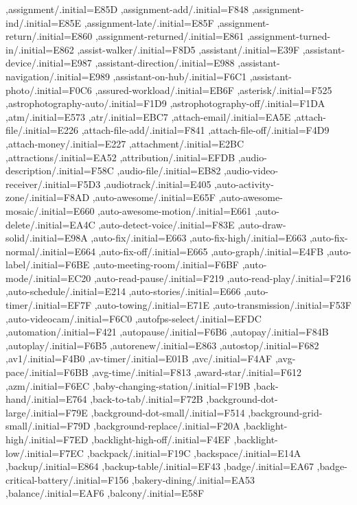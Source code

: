 { ,assignment/.initial=E85D
 ,assignment-add/.initial=F848
 ,assignment-ind/.initial=E85E
 ,assignment-late/.initial=E85F
 ,assignment-return/.initial=E860
 ,assignment-returned/.initial=E861
 ,assignment-turned-in/.initial=E862
 ,assist-walker/.initial=F8D5
 ,assistant/.initial=E39F
 ,assistant-device/.initial=E987
 ,assistant-direction/.initial=E988
 ,assistant-navigation/.initial=E989
 ,assistant-on-hub/.initial=F6C1
 ,assistant-photo/.initial=F0C6
 ,assured-workload/.initial=EB6F
 ,asterisk/.initial=F525
 ,astrophotography-auto/.initial=F1D9
 ,astrophotography-off/.initial=F1DA
 ,atm/.initial=E573
 ,atr/.initial=EBC7
 ,attach-email/.initial=EA5E
 ,attach-file/.initial=E226
 ,attach-file-add/.initial=F841
 ,attach-file-off/.initial=F4D9
 ,attach-money/.initial=E227
 ,attachment/.initial=E2BC
 ,attractions/.initial=EA52
 ,attribution/.initial=EFDB
 ,audio-description/.initial=F58C
 ,audio-file/.initial=EB82
 ,audio-video-receiver/.initial=F5D3
 ,audiotrack/.initial=E405
 ,auto-activity-zone/.initial=F8AD
 ,auto-awesome/.initial=E65F
 ,auto-awesome-mosaic/.initial=E660
 ,auto-awesome-motion/.initial=E661
 ,auto-delete/.initial=EA4C
 ,auto-detect-voice/.initial=F83E
 ,auto-draw-solid/.initial=E98A
 ,auto-fix/.initial=E663
 ,auto-fix-high/.initial=E663
 ,auto-fix-normal/.initial=E664
 ,auto-fix-off/.initial=E665
 ,auto-graph/.initial=E4FB
 ,auto-label/.initial=F6BE
 ,auto-meeting-room/.initial=F6BF
 ,auto-mode/.initial=EC20
 ,auto-read-pause/.initial=F219
 ,auto-read-play/.initial=F216
 ,auto-schedule/.initial=E214
 ,auto-stories/.initial=E666
 ,auto-timer/.initial=EF7F
 ,auto-towing/.initial=E71E
 ,auto-transmission/.initial=F53F
 ,auto-videocam/.initial=F6C0
 ,autofps-select/.initial=EFDC
 ,automation/.initial=F421
 ,autopause/.initial=F6B6
 ,autopay/.initial=F84B
 ,autoplay/.initial=F6B5
 ,autorenew/.initial=E863
 ,autostop/.initial=F682
 ,av1/.initial=F4B0
 ,av-timer/.initial=E01B
 ,avc/.initial=F4AF
 ,avg-pace/.initial=F6BB
 ,avg-time/.initial=F813
 ,award-star/.initial=F612
 ,azm/.initial=F6EC
 ,baby-changing-station/.initial=F19B
 ,back-hand/.initial=E764
 ,back-to-tab/.initial=F72B
 ,background-dot-large/.initial=F79E
 ,background-dot-small/.initial=F514
 ,background-grid-small/.initial=F79D
 ,background-replace/.initial=F20A
 ,backlight-high/.initial=F7ED
 ,backlight-high-off/.initial=F4EF
 ,backlight-low/.initial=F7EC
 ,backpack/.initial=F19C
 ,backspace/.initial=E14A
 ,backup/.initial=E864
 ,backup-table/.initial=EF43
 ,badge/.initial=EA67
 ,badge-critical-battery/.initial=F156
 ,bakery-dining/.initial=EA53
 ,balance/.initial=EAF6
 ,balcony/.initial=E58F
}
